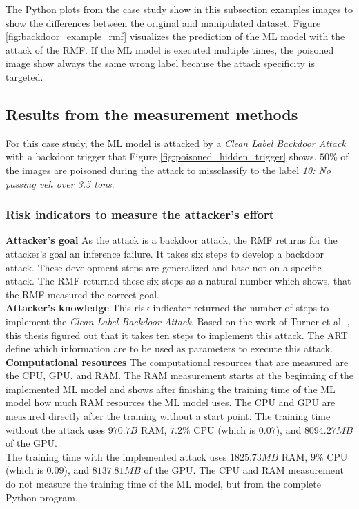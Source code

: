 The Python plots from the case study show in this subsection examples images to show the differences between the original and manipulated dataset. Figure \ref{fig:backdoor_example_rmf} visualizes the prediction of the ML model with the attack of the RMF. If the ML model is executed multiple times, the poisoned image show always the same wrong label because the attack specificity is targeted.

\subsection{Results from the measurement methods}

For this case study, the ML model is attacked by a \textit{Clean Label Backdoor Attack} with a backdoor trigger that Figure \ref{fig:poisoned_hidden_trigger} shows. $50\%$ of the images are poisoned during the attack to missclassify to the label \textit{10: No passing veh over 3.5 tons}.

\subsubsection*{Risk indicators to measure the attacker's effort}

\noindent\textbf{Attacker's goal} As the attack is a backdoor attack, the RMF returns for the attacker's goal an inference failure. It takes six steps to develop a backdoor attack. These development steps are generalized and base not on a specific attack. The RMF returned these six steps as a natural number which shows, that the RMF measured the correct goal. \\

\noindent\textbf{Attacker's knowledge} This risk indicator returned the number of steps to implement the \textit{Clean Label Backdoor Attack}. Based on the work of Turner et al. \cite{turner2018clean}, this thesis figured out that it takes ten steps to implement this attack. The ART \cite{art2018} define which information are to be used as parameters to execute this attack. \\

\noindent\textbf{Computational resources} The computational resources that are measured are the CPU, GPU, and RAM. The RAM measurement starts at the beginning of the implemented ML model and shows after finishing the training time of the ML model how much RAM resources the ML model uses. The CPU and GPU are measured directly after the training without a start point. The training time without the attack uses $970.7B$ RAM, $7.2\%$ CPU (which is $0.07$), and $8094.27MB$ of the GPU.\\ The training time with the implemented attack uses $1825.73MB$ RAM, $9\%$ CPU (which is $0.09$), and $8137.81MB$ of the GPU. The CPU and RAM measurement do not measure the training time of the ML model, but from the complete Python program.

